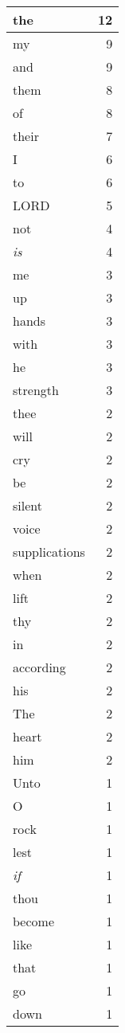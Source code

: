 \begin{center}
\begin{longtable}{l|r}
\hline \hline
\endlastfoot
the & 12 \\ \hline
my & 9 \\ \hline
and & 9 \\ \hline
them & 8 \\ \hline
of & 8 \\ \hline
their & 7 \\ \hline
I & 6 \\ \hline
to & 6 \\ \hline
LORD & 5 \\ \hline
not & 4 \\ \hline
\emph{is} & 4 \\ \hline
me & 3 \\ \hline
up & 3 \\ \hline
hands & 3 \\ \hline
with & 3 \\ \hline
he & 3 \\ \hline
strength & 3 \\ \hline
thee & 2 \\ \hline
will & 2 \\ \hline
cry & 2 \\ \hline
be & 2 \\ \hline
silent & 2 \\ \hline
voice & 2 \\ \hline
supplications & 2 \\ \hline
when & 2 \\ \hline
lift & 2 \\ \hline
thy & 2 \\ \hline
in & 2 \\ \hline
according & 2 \\ \hline
his & 2 \\ \hline
The & 2 \\ \hline
heart & 2 \\ \hline
him & 2 \\ \hline
Unto & 1 \\ \hline
O & 1 \\ \hline
rock & 1 \\ \hline
lest & 1 \\ \hline
\emph{if} & 1 \\ \hline
thou & 1 \\ \hline
become & 1 \\ \hline
like & 1 \\ \hline
that & 1 \\ \hline
go & 1 \\ \hline
down & 1 \\ \hline

\end{longtable}
\end{center}
